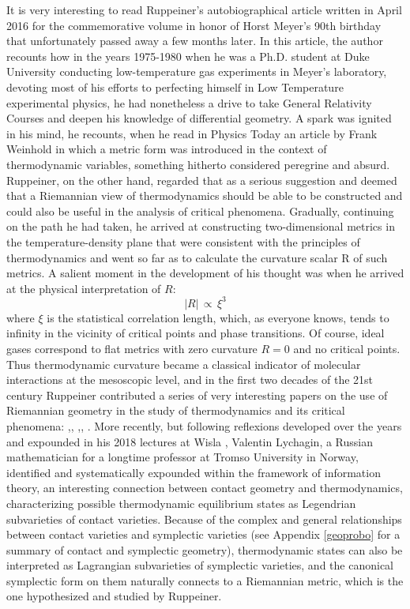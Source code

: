 \documentclass[10pt,a4paper]{article}
\begin{document}
It is very interesting to read Ruppeiner's autobiographical article \cite{Ruppeiner_2020} written in April 2016 for the commemorative volume in honor of Horst Meyer's 90th birthday that unfortunately  passed away a few months later. In this article, the author recounts how in the years 1975-1980 when he was a Ph.D. student at Duke University conducting low-temperature gas experiments in Meyer's laboratory, devoting most of his efforts to perfecting himself in Low Temperature experimental physics, he had nonetheless  a drive to take General Relativity Courses and deepen his knowledge of differential geometry. A spark was ignited in his mind, he recounts, when he read in Physics Today an article by Frank Weinhold\cite{vinoldo}  in which a metric form was introduced in the context of thermodynamic variables, something hitherto considered peregrine and absurd. Ruppeiner, on the other hand,  regarded that as a serious suggestion and deemed that a Riemannian view of thermodynamics should be able to be constructed and could also be useful in the analysis of critical phenomena. Gradually, continuing on the path  he had taken, he arrived at constructing two-dimensional metrics in the temperature-density plane that were consistent with the principles of thermodynamics and went so far as to calculate the curvature scalar R of such metrics. A salient moment in the development of his thought was when he arrived at the physical interpretation of $R$:
\begin{equation}\label{interpretoR}
    |R| \, \propto \, \xi^3
\end{equation}
where $\xi$ is the statistical correlation length, which, as everyone knows, tends to infinity in the vicinity of critical points and phase transitions. Of course, ideal gases correspond to flat metrics with zero curvature $R=0$  and no critical points. Thus thermodynamic curvature became a classical indicator of molecular interactions at the mesoscopic level, and in the first two decades of the 21st century Ruppeiner contributed a series of very interesting papers on the use of Riemannian geometry in the study of thermodynamics and its critical phenomena: \cite{Ruppeiner_2010},\cite{Ruppeiner_2012},\cite{Ruppeiner_2012b}
\cite{Ruppeiner_2013},\cite{ruppoRdiag}, \cite{Ruppeiner_2020}.
More recently, but following reflexions developed over the years and expounded in his 2018 lectures at Wisla
\cite{lychaginlecture}, Valentin Lychagin, a Russian mathematician for  a longtime professor at Tromso University in Norway, identified and systematically expounded within the framework of information theory, an interesting connection between contact geometry and thermodynamics, characterizing possible thermodynamic equilibrium states as Legendrian subvarieties of contact varieties. Because of the complex and general relationships between contact varieties and symplectic varieties (see Appendix \ref{geoprobo} for a summary of contact and symplectic geometry), thermodynamic states can also be interpreted as Lagrangian subvarieties of symplectic varieties, and the canonical symplectic form on them naturally connects to a Riemannian metric, which is the one hypothesized and studied by Ruppeiner.
\end{document}
